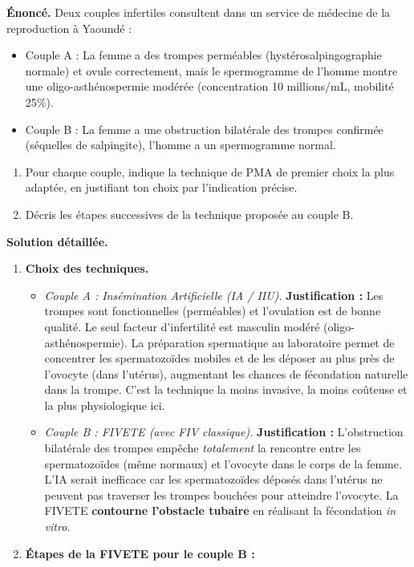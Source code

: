 \documentclass[11pt]{article}
\begin{document}
\begin{exoresolu}
\textbf{Énoncé.} Deux couples infertiles consultent dans un service de médecine de la reproduction à Yaoundé :
\begin{itemize}
\item Couple A : La femme a des trompes perméables (hystérosalpingographie normale) et ovule correctement, mais le spermogramme de l'homme montre une oligo-asthénospermie modérée (concentration 10 millions/mL, mobilité 25\%).
\item Couple B : La femme a une obstruction bilatérale des trompes confirmée (séquelles de salpingite), l'homme a un spermogramme normal.
\end{itemize}
\begin{enumerate}
\item Pour chaque couple, indique la technique de PMA de premier choix la plus adaptée, en justifiant ton choix par l'indication précise.
\item Décris les étapes successives de la technique proposée au couple B.
\end{enumerate}
\tcblower
\textbf{Solution détaillée.}
\begin{enumerate}
\item \textbf{Choix des techniques.}
\begin{itemize}
\item \emph{Couple A : Insémination Artificielle (IA / IIU).} 
\textbf{Justification :} Les trompes sont fonctionnelles (perméables) et l'ovulation est de bonne qualité. Le seul facteur d'infertilité est masculin modéré (oligo-asthénospermie). La préparation spermatique au laboratoire permet de concentrer les spermatozoïdes mobiles et de les déposer au plus près de l'ovocyte (dans l'utérus), augmentant les chances de fécondation naturelle dans la trompe. C'est la technique la moins invasive, la moins coûteuse et la plus physiologique ici.
\item \emph{Couple B : FIVETE (avec FIV classique).} 
\textbf{Justification :} L'obstruction bilatérale des trompes empêche \emph{totalement} la rencontre entre les spermatozoïdes (même normaux) et l'ovocyte dans le corps de la femme. L'IA serait inefficace car les spermatozoïdes déposés dans l'utérus ne peuvent pas traverser les trompes bouchées pour atteindre l'ovocyte. La FIVETE \textbf{contourne l'obstacle tubaire} en réalisant la fécondation \emph{in vitro}.
\end{itemize}
\item \textbf{Étapes de la FIVETE pour le couple B :}

\end{enumerate}
\end{exoresolu}
\end{document}
